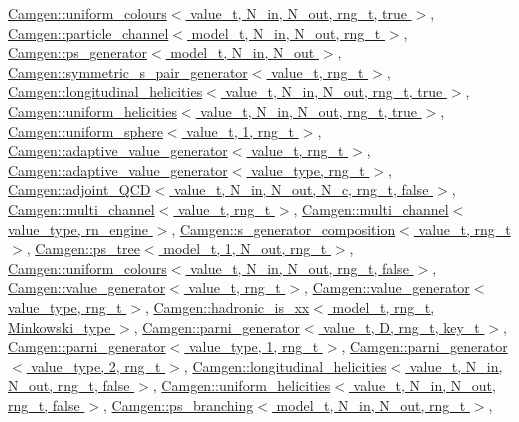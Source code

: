 \hyperlink{a00559_ad1769415de6a7b3bb5b6337bde287f10}{Camgen\+::uniform\+\_\+colours$<$ value\+\_\+t, N\+\_\+in, N\+\_\+out, rng\+\_\+t, true $>$}, \hyperlink{a00401_a23098c7456702cce4946d0d787f5bf37}{Camgen\+::particle\+\_\+channel$<$ model\+\_\+t, N\+\_\+in, N\+\_\+out, rng\+\_\+t $>$}, \hyperlink{a00450_ab73a5fc08e805563cef84e20f711c569}{Camgen\+::ps\+\_\+generator$<$ model\+\_\+t, N\+\_\+in, N\+\_\+out $>$}, \hyperlink{a00534_a5f259afbf4c7c1f73649bd3775b14517}{Camgen\+::symmetric\+\_\+s\+\_\+pair\+\_\+generator$<$ value\+\_\+t, rng\+\_\+t $>$}, \hyperlink{a00333_a6af00df1327dfe34abae1acf0efba050}{Camgen\+::longitudinal\+\_\+helicities$<$ value\+\_\+t, N\+\_\+in, N\+\_\+out, rng\+\_\+t, true $>$}, \hyperlink{a00563_acc8bc9c14f4b084d79b53429a8a77e5a}{Camgen\+::uniform\+\_\+helicities$<$ value\+\_\+t, N\+\_\+in, N\+\_\+out, rng\+\_\+t, true $>$}, \hyperlink{a00567_a794960777078db27c1b1e7d8fe7e0b38}{Camgen\+::uniform\+\_\+sphere$<$ value\+\_\+t, 1, rng\+\_\+t $>$}, \hyperlink{a00001_a11e0685ef5d48c65f96a514a87be6c89}{Camgen\+::adaptive\+\_\+value\+\_\+generator$<$ value\+\_\+t, rng\+\_\+t $>$}, \hyperlink{a00001_a11e0685ef5d48c65f96a514a87be6c89}{Camgen\+::adaptive\+\_\+value\+\_\+generator$<$ value\+\_\+type, rng\+\_\+t $>$}, \hyperlink{a00004_a8c71ddaea3b2e2eedc6b3b15504d4138}{Camgen\+::adjoint\+\_\+\+Q\+C\+D$<$ value\+\_\+t, N\+\_\+in, N\+\_\+out, N\+\_\+c, rng\+\_\+t, false $>$}, \hyperlink{a00379_ae47b19549d982e49894e5a22599eb742}{Camgen\+::multi\+\_\+channel$<$ value\+\_\+t, rng\+\_\+t $>$}, \hyperlink{a00379_ae47b19549d982e49894e5a22599eb742}{Camgen\+::multi\+\_\+channel$<$ value\+\_\+type, rn\+\_\+engine $>$}, \hyperlink{a00493_afac746267d9514f8dc7d039f64521fd6}{Camgen\+::s\+\_\+generator\+\_\+composition$<$ value\+\_\+t, rng\+\_\+t $>$}, \hyperlink{a00456_ad91a1695b8d82e9b88318bc32442457f}{Camgen\+::ps\+\_\+tree$<$ model\+\_\+t, 1, N\+\_\+out, rng\+\_\+t $>$}, \hyperlink{a00558_ad9883f19eca4ca64dd47a781defd9ce1}{Camgen\+::uniform\+\_\+colours$<$ value\+\_\+t, N\+\_\+in, N\+\_\+out, rng\+\_\+t, false $>$}, \hyperlink{a00577_ae3f628417738cf3079006729b9ce829e}{Camgen\+::value\+\_\+generator$<$ value\+\_\+t, rng\+\_\+t $>$}, \hyperlink{a00577_ae3f628417738cf3079006729b9ce829e}{Camgen\+::value\+\_\+generator$<$ value\+\_\+type, rng\+\_\+t $>$}, \hyperlink{a00261_a0272f975dde2f379cb798684624c2958}{Camgen\+::hadronic\+\_\+is\+\_\+xx$<$ model\+\_\+t, rng\+\_\+t, Minkowski\+\_\+type $>$}, \hyperlink{a00393_a5ecf885625343527c23fafaea48de1d4}{Camgen\+::parni\+\_\+generator$<$ value\+\_\+t, D, rng\+\_\+t, key\+\_\+t $>$}, \hyperlink{a00393_a5ecf885625343527c23fafaea48de1d4}{Camgen\+::parni\+\_\+generator$<$ value\+\_\+type, 1, rng\+\_\+t $>$}, \hyperlink{a00393_a5ecf885625343527c23fafaea48de1d4}{Camgen\+::parni\+\_\+generator$<$ value\+\_\+type, 2, rng\+\_\+t $>$}, \hyperlink{a00332_a3d2bc9d0b8d805fc43dab21117f0ddbd}{Camgen\+::longitudinal\+\_\+helicities$<$ value\+\_\+t, N\+\_\+in, N\+\_\+out, rng\+\_\+t, false $>$}, \hyperlink{a00562_a5e2b03a2b0e95a752e7f0c880f47b9e6}{Camgen\+::uniform\+\_\+helicities$<$ value\+\_\+t, N\+\_\+in, N\+\_\+out, rng\+\_\+t, false $>$}, \hyperlink{a00445_afd6381ce5a2d653a8389c305460a6ecb}{Camgen\+::ps\+\_\+branching$<$ model\+\_\+t, N\+\_\+in, N\+\_\+out, rng\+\_\+t $>$}, 